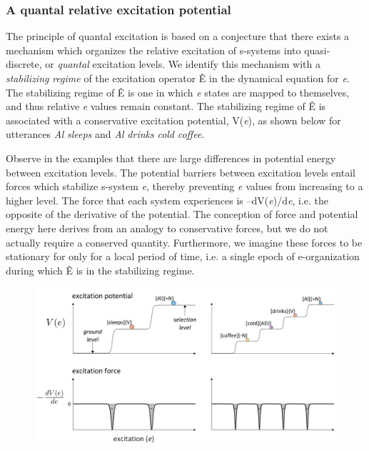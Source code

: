 \subsubsection{A quantal relative excitation potential}

The principle of quantal excitation is based on a conjecture that there exists a mechanism which organizes the relative excitation of s-systems into quasi-discrete, or \textit{quantal} excitation levels. We identify this mechanism with a \textit{stabilizing} \textit{regime} of the excitation operator Ê in the dynamical equation for \textit{e}. The stabilizing regime of Ê is one in which \textit{e} states are mapped to themselves, and thus relative \textit{e} values remain constant. The stabilizing regime of Ê is associated with a conservative excitation potential, V(\textit{e}), as shown below for utterances \textit{Al} \textit{sleeps} and \textit{Al} \textit{drinks} \textit{cold} \textit{coffee}. 

  Observe in the examples that there are large differences in potential energy between excitation levels. The potential barriers between excitation levels entail forces which stabilize s-system \textit{e}, thereby preventing \textit{e} values from increasing to a higher level. The force that each system experiences is –dV(\textit{e})/d\textit{e}, i.e. the opposite of the derivative of the potential. The conception of force and potential energy here derives from an analogy to conservative forces, but we do not actually require a conserved quantity. Furthermore, we imagine these forces to be stationary for only for a local period of time, i.e. a single epoch of e-organization during which Ê is in the stabilizing regime. 

  
\begin{figure}
\includegraphics[width=\textwidth]{figures/Tilsen-img23.png}
\caption{\missingcaption}
\label{fig:}
\end{figure}
 

